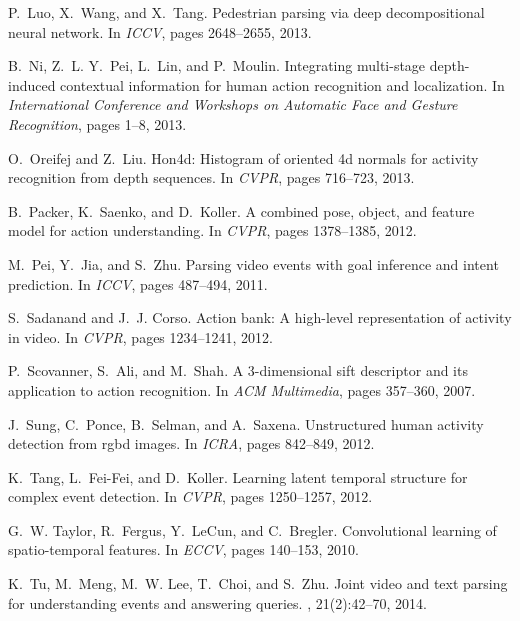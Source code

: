 \documentclass{sig-alternate}
\begin{document}
\begin{thebibliography}{40}
P.~Luo, X.~Wang, and X.~Tang.
\newblock Pedestrian parsing via deep decompositional neural network.
\newblock In {\em ICCV}, pages 2648--2655, 2013.

B.~Ni, Z.~L. Y.~Pei, L.~Lin, and P.~Moulin.
\newblock Integrating multi-stage depth-induced contextual information for
  human action recognition and localization.
\newblock In {\em International Conference and Workshops on Automatic Face and
  Gesture Recognition}, pages 1--8, 2013.

O.~Oreifej and Z.~Liu.
\newblock Hon4d: Histogram of oriented 4d normals for activity recognition from
  depth sequences.
\newblock In {\em CVPR}, pages 716--723, 2013.

B.~Packer, K.~Saenko, and D.~Koller.
\newblock A combined pose, object, and feature model for action understanding.
\newblock In {\em CVPR}, pages 1378--1385, 2012.

M.~Pei, Y.~Jia, and S.~Zhu.
\newblock Parsing video events with goal inference and intent prediction.
\newblock In {\em ICCV}, pages 487--494, 2011.

S.~Sadanand and J.~J. Corso.
\newblock Action bank: A high-level representation of activity in video.
\newblock In {\em CVPR}, pages 1234--1241, 2012.

P.~Scovanner, S.~Ali, and M.~Shah.
\newblock A 3-dimensional sift descriptor and its application to action
  recognition.
\newblock In {\em ACM Multimedia}, pages 357--360, 2007.

J.~Sung, C.~Ponce, B.~Selman, and A.~Saxena.
\newblock Unstructured human activity detection from rgbd images.
\newblock In {\em ICRA}, pages 842--849, 2012.

K.~Tang, L.~Fei-Fei, and D.~Koller.
\newblock Learning latent temporal structure for complex event detection.
\newblock In {\em CVPR}, pages 1250--1257, 2012.

G.~W. Taylor, R.~Fergus, Y.~LeCun, and C.~Bregler.
\newblock Convolutional learning of spatio-temporal features.
\newblock In {\em ECCV}, pages 140--153, 2010.

K.~Tu, M.~Meng, M.~W. Lee, T.~Choi, and S.~Zhu.
\newblock Joint video and text parsing for understanding events and answering
  queries.
, 21(2):42--70, 2014.


\end{thebibliography}
\end{document}

